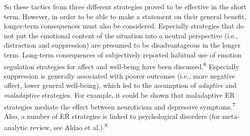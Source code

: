 \documentclass[
  english,
  man,floatsintext]{apa6}
\begin{document}
So these tactics from three different strategies proved to be effective in the short term.
However, in order to be able to make a statement on their general benefit, longer-term consequences must also be considered.
Especially strategies that do not put the emotional content of the situation into a neutral perspective (i.e., distraction and suppression) are presumed to be disadvantageous in the longer term.
Long-term consequences of subjectively reported habitual use of emotion regulation strategies for affect and well-being have been discussed.\textsuperscript{6}
Especially suppression is generally associated with poorer outcomes (i.e., more negative affect, lower general well-being), which led to the assumption of \emph{adaptive} and \emph{maladaptive} strategies.
For example, it could be shown that maladaptive ER strategies mediate the effect between neuroticism and depressive symptoms.\textsuperscript{7}
Also, a number of ER strategies is linked to psychological disorders (for meta-analytic review, see Aldao et al.).\textsuperscript{8}
\end{document}
